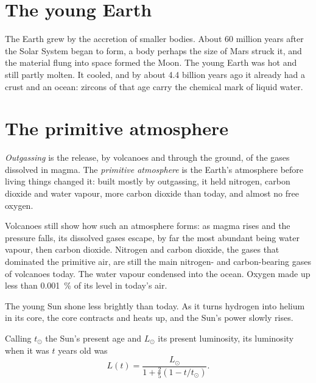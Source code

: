 \section{The young Earth}

The Earth grew by the accretion of smaller bodies. About 60 million years
after the Solar System began to form, a body perhaps the size of Mars struck
it, and the material flung into space formed the Moon. The young Earth was
hot and still partly molten. It cooled, and by about 4.4 billion years ago it
already had a crust and an ocean: zircons of that age carry the chemical mark
of liquid water.

\section{The primitive atmosphere}

\begin{definition}\label{def:g12:early-earth:primitive-atmosphere}
\emph{Outgassing} is the release, by volcanoes and through
the ground, of the gases dissolved in magma. The \emph{primitive
atmosphere} is the Earth's atmosphere before
living things changed it: built mostly by outgassing, it held nitrogen,
carbon dioxide and water vapour, more carbon dioxide than today, and almost
no free oxygen.
\end{definition}

Volcanoes still show how such an atmosphere forms: as magma rises and the
pressure falls, its dissolved gases escape, by far the most abundant being
water vapour, then carbon dioxide. Nitrogen and carbon dioxide, the gases
that dominated the primitive air, are still the main nitrogen- and
carbon-bearing gases of volcanoes today. The water vapour condensed into the
ocean. Oxygen made up less than \qty{0.001}{\percent} of its level in today's
air.

The young Sun shone less brightly than today. As it turns hydrogen into
helium in its core, the core contracts and heats up, and the Sun's power
slowly rises.

\begin{proposition}\label{prop:g12:early-earth:luminosity}
Calling $t_\odot$ the Sun's present age and $L_\odot$ its present
luminosity, its luminosity when it was $t$ years old was
\[
  L(t) = \frac{L_\odot}{1 + \frac{2}{5}\left(1 - t/t_\odot\right)} .
\]
\end{proposition}

